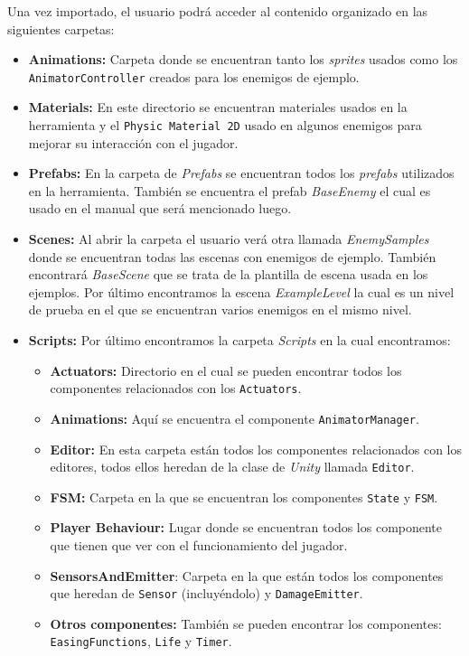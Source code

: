 Una vez importado, el usuario podrá acceder al contenido organizado en las siguientes carpetas:
\begin{itemize}
\item \textbf{Animations:} Carpeta donde se encuentran tanto los \textit{sprites} usados como los \texttt{AnimatorController} creados para los enemigos de ejemplo.
\item \textbf{Materials:} En este directorio se encuentran materiales usados en la herramienta y el \texttt{Physic Material 2D} usado en algunos enemigos para mejorar su interacción con el jugador.
\item \textbf{Prefabs:} En la carpeta de \textit{Prefabs} se encuentran todos los \textit{prefabs} utilizados en la herramienta. También se encuentra el prefab \textit{BaseEnemy} el cual es usado en el manual que será mencionado luego.
\item \textbf{Scenes:} Al abrir la carpeta el usuario verá otra llamada \textit{EnemySamples} donde se encuentran todas las escenas con enemigos de ejemplo. También encontrará \textit{BaseScene} que se trata de la plantilla de escena usada en los ejemplos. Por último encontramos la escena \textit{ExampleLevel} la cual es un nivel de prueba en el que se encuentran varios enemigos en el mismo nivel.
\item \textbf{Scripts:} Por último encontramos la carpeta \textit{Scripts} en la cual encontramos:
	\begin{itemize}
	\item \textbf{Actuators:} Directorio en el cual se pueden encontrar todos los componentes relacionados con los \texttt{Actuators}.
	\item \textbf{Animations:} Aquí se encuentra el componente \texttt{AnimatorManager}.
	\item \textbf{Editor:} En esta carpeta están todos los componentes relacionados con los editores, todos ellos heredan de la clase de \textit{Unity} llamada \texttt{Editor}.
	\item \textbf{FSM:} Carpeta en la que se encuentran los componentes \texttt{State} y \texttt{FSM}.
	\item \textbf{Player Behaviour:} Lugar donde se encuentran todos los componente que tienen que ver con el funcionamiento del jugador.
	\item \textbf{SensorsAndEmitter}: Carpeta en la que están todos los componentes que heredan de \texttt{Sensor} (incluyéndolo) y \texttt{DamageEmitter}.
	\item \textbf{Otros componentes:} También se pueden encontrar los componentes: \texttt{EasingFunctions}, \texttt{Life} y \texttt{Timer}.
	\end{itemize}
\end{itemize}

